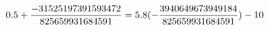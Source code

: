 \documentclass[preview]{standalone}
\begin{document}
\begin{align*}
\special{dvisvgm:raw <g id='unique000'>}0.5 +\frac{-31525197391593472}{825659931684591} = 5.8 (- \frac{3940649673949184}{825659931684591}) - 10\special{dvisvgm:raw </g>}
\end{align*}
\end{document}
